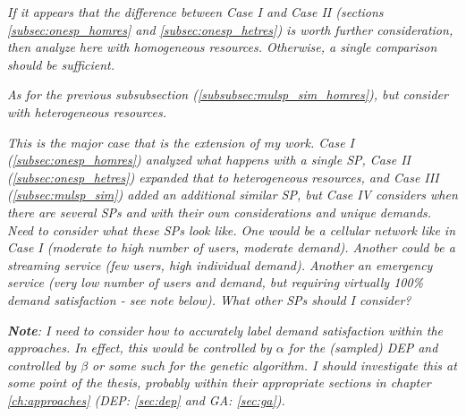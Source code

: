 \documentclass[12pt,dvipsnames]{report}
\begin{document}

\textit{If it appears that the difference between Case I and Case II (sections \ref{subsec:onesp_homres} and \ref{subsec:onesp_hetres}) is worth further consideration, then analyze here with homogeneous resources.  Otherwise, a single comparison should be sufficient.}


\textit{As for the previous subsubsection (\ref{subsubsec:mulsp_sim_homres}), but consider with heterogeneous resources.}


\textit{This is the major case that is the extension of my work.  Case I (\ref{subsec:onesp_homres}) analyzed what happens with a single SP, Case II (\ref{subsec:onesp_hetres}) expanded that to heterogeneous resources, and Case III (\ref{subsec:mulsp_sim}) added an additional similar SP, but Case IV considers when there are several SPs and with their own considerations and unique demands.  Need to consider what these SPs look like.  One would be a cellular network like in Case I (moderate to high number of users, moderate demand).  Another could be a streaming service (few users, high individual demand).  Another an emergency service (very low number of users and demand, but requiring virtually 100\% demand satisfaction - see note below).  What other SPs should I consider?}

\textit{\textbf{Note}: I need to consider how to accurately label demand satisfaction within the approaches.  In effect, this would be controlled by $\alpha$ for the (sampled) DEP and controlled by $\beta$ or some such for the genetic algorithm.  I should investigate this at some point of the thesis, probably within their appropriate sections in chapter \ref{ch:approaches} (DEP: \ref{sec:dep} and GA: \ref{sec:ga}).}

\end{document}
